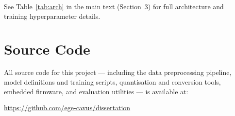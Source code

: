 \documentclass[11pt]{article}
\begin{document}
\begin{appendices}
See Table~\ref{tab:arch} in the main text (Section~3) for full architecture and training hyperparameter details.

\section{Source Code}
\label{app:code}

All source code for this project — including the data preprocessing pipeline, model definitions and training scripts, quantisation and conversion tools, embedded firmware, and evaluation utilities — is available at:

\begin{center}
\url{https://github.com/ege-cavus/dissertation}
\end{center}

\end{appendices}
\end{document}
